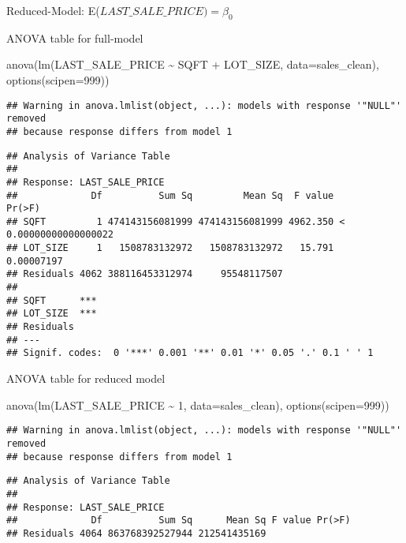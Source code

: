 \documentclass[
]{article}
\newenvironment{Shaded}{\begin{snugshade}}{\end{snugshade}}
\newcommand{\AttributeTok}[1]{\textcolor[rgb]{0.77,0.63,0.00}{#1}}
\newcommand{\DecValTok}[1]{\textcolor[rgb]{0.00,0.00,0.81}{#1}}
\newcommand{\FunctionTok}[1]{\textcolor[rgb]{0.00,0.00,0.00}{#1}}
\newcommand{\NormalTok}[1]{#1}
\newcommand{\SpecialCharTok}[1]{\textcolor[rgb]{0.00,0.00,0.00}{#1}}
\begin{document}
Reduced-Model: E(\(LAST\_SALE\_PRICE)=\beta_0\)

ANOVA table for full-model

\begin{Shaded}
\begin{Highlighting}[]
\FunctionTok{anova}\NormalTok{(}\FunctionTok{lm}\NormalTok{(LAST\_SALE\_PRICE }\SpecialCharTok{\textasciitilde{}}\NormalTok{ SQFT }\SpecialCharTok{+}\NormalTok{ LOT\_SIZE, }\AttributeTok{data=}\NormalTok{sales\_clean), }\FunctionTok{options}\NormalTok{(}\AttributeTok{scipen=}\DecValTok{999}\NormalTok{))}
\end{Highlighting}
\end{Shaded}

\begin{verbatim}
## Warning in anova.lmlist(object, ...): models with response '"NULL"' removed
## because response differs from model 1
\end{verbatim}

\begin{verbatim}
## Analysis of Variance Table
## 
## Response: LAST_SALE_PRICE
##             Df          Sum Sq         Mean Sq  F value                Pr(>F)
## SQFT         1 474143156081999 474143156081999 4962.350 < 0.00000000000000022
## LOT_SIZE     1   1508783132972   1508783132972   15.791            0.00007197
## Residuals 4062 388116453312974     95548117507                               
##              
## SQFT      ***
## LOT_SIZE  ***
## Residuals    
## ---
## Signif. codes:  0 '***' 0.001 '**' 0.01 '*' 0.05 '.' 0.1 ' ' 1
\end{verbatim}

ANOVA table for reduced model

\begin{Shaded}
\begin{Highlighting}[]
\FunctionTok{anova}\NormalTok{(}\FunctionTok{lm}\NormalTok{(LAST\_SALE\_PRICE }\SpecialCharTok{\textasciitilde{}} \DecValTok{1}\NormalTok{, }\AttributeTok{data=}\NormalTok{sales\_clean), }\FunctionTok{options}\NormalTok{(}\AttributeTok{scipen=}\DecValTok{999}\NormalTok{))}
\end{Highlighting}
\end{Shaded}

\begin{verbatim}
## Warning in anova.lmlist(object, ...): models with response '"NULL"' removed
## because response differs from model 1
\end{verbatim}

\begin{verbatim}
## Analysis of Variance Table
## 
## Response: LAST_SALE_PRICE
##             Df          Sum Sq      Mean Sq F value Pr(>F)
## Residuals 4064 863768392527944 212541435169
\end{verbatim}
\end{document}
